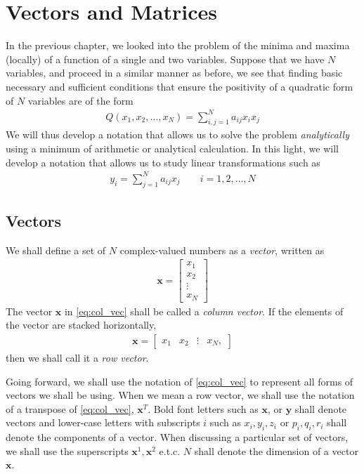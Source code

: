 \chapter{Vectors and Matrices}  
 \label{chap:vectors::intro}
 
 In the previous chapter, we looked into the problem of the minima and maxima (locally) of a function of a single and two variables. Suppose that we have $N$ variables, and proceed in a similar manner as before, we see that finding basic necessary and sufficient conditions that ensure the positivity of a quadratic form of $N$ variables are of the form
 \begin{align}
 	Q(x_1, x_2, \ldots, x_N) = \sum_{i,j=1}^{N} a_{ij} x_i x_j
 \end{align}
 We will thus develop a notation that allows us to solve the problem \textit{analytically} using a minimum of arithmetic or analytical calculation. In this light, we will develop a notation that allows us to study linear transformations such as
 \begin{align}
 	y_i = \sum_{j=1}^{N} a_{ij} x_j \qquad i=1,2, \ldots, N
 \end{align}
 
 \section{Vectors}
 
 We shall define a set of $N$ complex-valued numbers as a \textit{vector}, written as
 \begin{align}
 	\bm{x} = \begin{bmatrix}
 	x_1 \\ x_2 \\ \vdots \\ x_N
 	\end{bmatrix}
 	\label{eq:col_vec}
 \end{align}
 The vector $\bm{x}$ in \eqref{eq:col_vec} shall be called a \textit{column vector}. If the elements of the vector are stacked horizontally, \ie 
 \begin{align}
\bm{x} = \begin{bmatrix}
x_1 & x_2 & \vdots & x_N,
\end{bmatrix}
\label{eq:row_vec}
\end{align}
%
then we shall call it a \textit{row vector}.

Going forward, we shall use the notation of \eqref{eq:col_vec} to represent all forms of vectors we shall be using. When we mean a row vector, we shall use the notation of a transpose of \eqref{eq:col_vec}, \ie $\bm{x}^T$. Bold font letters such as $\bm{x}$, or  $\bm{y}$ shall denote vectors and lower-case letters with subscripts $i$ such as $x_i, y_i, z_i$ or $p_i, q_i, r_i$ shall denote the components of a vector. When discussing a particular set of vectors, we shall use the superscripts $\bm{x}^1, \bm{x}^2$ e.t.c. $N$ shall denote the dimension of a vector $\bm{x}$.

